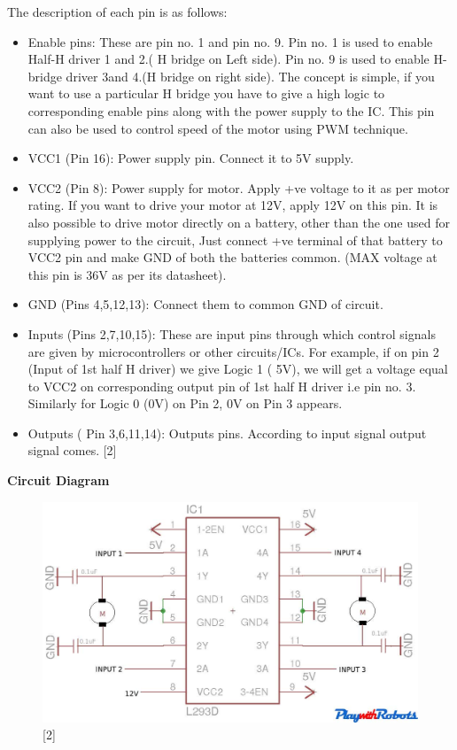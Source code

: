 \documentclass[11pt,a4paper]{article}
\begin{document}
    The description of each pin is as follows:
    \begin{itemize}
    	\item Enable pins: These are pin no. 1 and pin no. 9. Pin no. 1 is used to enable Half-H driver 1 and 2.( H bridge on Left side). Pin no. 9 is used to enable H-bridge driver 3and 4.(H bridge on right side). The concept is simple, if you want to use a particular H bridge you have to give a high logic to corresponding enable pins along with the power supply to the IC. This pin can also be used to control speed of the motor using PWM technique.
    	\item VCC1 (Pin 16): Power supply pin. Connect it to 5V supply.
    	\item VCC2 (Pin 8): Power supply for motor. Apply +ve voltage to it as per motor rating. If you want to drive your motor at 12V, apply 12V on this pin. It is also possible to drive motor directly on a battery, other than the one used for supplying power to the circuit, Just connect +ve terminal of that battery to VCC2 pin and make GND of both the batteries common. (MAX voltage at this pin is 36V as per its datasheet).
    	\item GND (Pins 4,5,12,13): Connect them to common GND of circuit.
    	\item Inputs (Pins 2,7,10,15): These are input pins through which control signals are given by microcontrollers or other circuits/ICs. For example, if on pin 2 (Input of 1st half H driver) we give Logic 1 ( 5V), we will get a voltage equal to VCC2 on corresponding output pin of 1st half H driver i.e pin no. 3. Similarly for Logic 0 (0V) on Pin 2, 0V on Pin 3 appears.
    	\item Outputs ( Pin 3,6,11,14): Outputs pins. According to input signal output signal comes. [2]
    \end{itemize}
    
    \vspace{0.3cm}
    \textbf{Circuit Diagram}
    
    \begin{figure}[h!]
    	\includegraphics[scale=0.5]{lc.jpg}
    	\centering
    	\caption{[2]}
    \end{figure}
    
\end{document}
